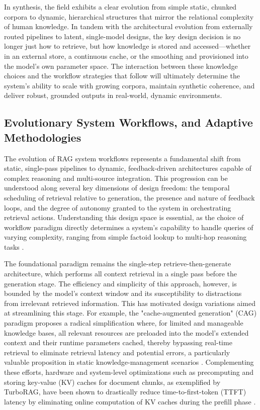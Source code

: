 \documentclass[11pt,a4paper]{article}
\begin{document}
In synthesis, the field exhibits a clear evolution from simple static, chunked corpora to dynamic, hierarchical structures that mirror the relational complexity of human knowledge. In tandem with the architectural evolution from externally routed pipelines to latent, single-model designs, the key design decision is no longer just how to retrieve, but how knowledge is stored and accessed---whether in an external store, a continuous cache, or the smoothing and provisioned into the model's own parameter space. The interaction between these knowledge choices and the workflow strategies that follow will ultimately determine the system's ability to scale with growing corpora, maintain synthetic coherence, and deliver robust, grounded outputs in real-world, dynamic environments.


\subsection{Evolutionary System Workflows, and Adaptive Methodologies}


The evolution of RAG system workflows represents a fundamental shift from static, single-pass pipelines to dynamic, feedback-driven architectures capable of complex reasoning and multi-source integration. This progression can be understood along several key dimensions of design freedom: the temporal scheduling of retrieval relative to generation, the presence and nature of feedback loops, and the degree of autonomy granted to the system in orchestrating retrieval actions. Understanding this design space is essential, as the choice of workflow paradigm directly determines a system's capability to handle queries of varying complexity, ranging from simple factoid lookup to multi-hop reasoning tasks \cite{arxiv:2410.12837v1}.

The foundational paradigm remains the single-step retrieve-then-generate architecture, which performs all context retrieval in a single pass before the generation stage. The efficiency and simplicity of this approach, however, is bounded by the model's context window and its susceptibility to distractions from irrelevant retrieved information. This has motivated design variations aimed at streamlining this stage. For example, the "cache-augmented generation" (CAG) paradigm proposes a radical simplification where, for limited and manageable knowledge bases, all relevant resources are preloaded into the model's extended context and their runtime parameters cached, thereby bypassing real-time retrieval to eliminate retrieval latency and potential errors, a particularly valuable proposition in static knowledge-management scenarios \cite{arxiv:2412.15605v2}. Complementing these efforts, hardware and system-level optimizations such as precomputing and storing key-value (KV) caches for document chunks, as exemplified by TurboRAG, have been shown to drastically reduce time-to-first-token (TTFT) latency by eliminating online computation of KV caches during the prefill phase \cite{arxiv:2410.07590v1}.
\end{document}
